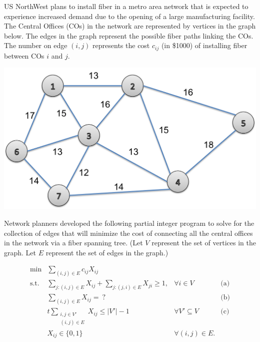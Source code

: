 \documentclass[12pt]{exam}
\begin{document}
\begin{questions}


\newpage

\question
US NorthWest plans to install fiber in a metro area network that is expected to experience increased demand due to the opening of a large manufacturing facility.  The Central Offices (COs) in the network are represented by vertices in the graph below.  The edges in the graph represent the possible fiber paths linking the COs.  The number on edge $(i,j)$ represents the cost $c_{ij}$ (in \$1000) of installing fiber between COs $i$ and $j$.

\begin{center}
\includegraphics[width = .4\textwidth]{uswest_network}
\end{center}

Network planners developed the following partial integer program to solve for the collection of edges that will minimize the cost of connecting all the central offices in the network via a fiber spanning tree.  (Let $V$ represent the set of vertices in the graph.  Let $E$ represent the set of edges in the graph.)

\begin{equation}
  \label{eq:mst}
  \tag{MST}
  \begin{array}{llll}
    \min & \displaystyle \sum_{(i,j)\in E} c_{ij} X_{ij} & & \\
    \mbox{s.t.} & \sum_{j:(i,j) \in E} X_{ij} + 
    \sum_{j:(j,i) \in E} X_{ji} \geq 1, & \forall i \in V &
    \mbox{(a)} \\[4mm]
    & \sum_{(i,j) \in E} X_{ij} = ~? & & \mbox{(b)} \\[4mm]
    &  t \sum_{\substack{i,j \in V' \\ (i,j) \in E}} X_{ij} \leq |V'| - 1 & \forall V' \subseteq V & \mbox{(c)} \\[4mm]
    & X_{ij} \in \{0,1\} & \forall (i,j) \in E. &
  \end{array}
\end{equation}




\end{questions}
\end{document}
